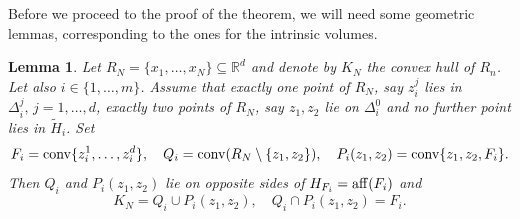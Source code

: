 \documentclass[10pt]{amsart}
\newcommand{\1}{\textbf{1}}
\newcommand{\conv}{{\rm conv}}
\numberwithin{equation}{section} %
\newtheorem{lemma}[theorem]{Lemma}
\theoremstyle{remark}
\theoremstyle{definition}
\begin{document}
Before we proceed to the proof of the theorem, we will need some geometric lemmas, corresponding to the ones for the intrinsic volumes.


\begin{lemma}\label{lem:faces-construction}
Let $R_N=\{x_1,\ldots,x_N\} \subseteq \mathbb{R}^d$ and denote by $K_N$ the convex hull of $R_n$. Let also $i \in \{1,\ldots,m\}$. Assume that exactly one point of $R_N$, say $z_i^j$ lies in $\Delta_i^j, \, j=1,\ldots,d$, exactly two points of $R_N$, say $z_1,z_2$ lie on $\Delta_i^0$ and no further point lies in $\widetilde{H}_i$.  Set \[F_i=\conv\{z_i^1,\ldots,z_i^d\}, \quad Q_i=\conv(R_N\setminus\{z_1,z_2\}), \quad P_i(z_1,z_2)=\conv\{z_1,z_2,F_i\}. \] Then $Q_i$ and $P_i(z_1,z_2)$ lie on opposite sides of $H_{F_i}={\rm aff}(F_i)$ and\[K_N=Q_i \cup P_i(z_1,z_2), \quad Q_i \cap P_i(z_1,z_2)=F_i.\]   
\end{lemma}
\end{document}
